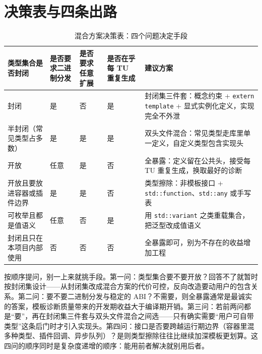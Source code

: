 \documentclass[12pt,a4paper,fontset=fandol]{ctexbook}
\newcommand{\kw}[1]{\texttt{#1}}
\begin{document}
\section{决策表与四条出路}

\begin{table}[htbp]
\centering
\caption{混合方案决策表：四个问题决定手段}
\begin{tabular}{@{}>{\raggedright\arraybackslash}p{}>{\raggedright\arraybackslash}p{}>{\raggedright\arraybackslash}p{}>{\raggedright\arraybackslash}p{}>{\raggedright\arraybackslash}p{}@{}}
\toprule
类型集合是否封闭 & 是否要求二进制分发 & 是否要求任意扩展 & 是否在乎每 TU 重复生成 & 建议方案 \\
\midrule
封闭 & 是 & 否 & 是 & 封闭集三件套：概念约束 + \kw{extern template} + 显式实例化定义，实现完全不外泄 \\
\addlinespace
半封闭（常见类型占多数） & 是 & 是 & 是 & 双头文件混合：常见类型走库里单一定义，自定义类型包含实现头 \\
\addlinespace
开放 & 任意 & 是 & 否 & 全暴露：定义留在公共头，接受每 TU 重复生成，换取最好的诊断 \\
\addlinespace
开放且要放进容器或插件边界 & 是 & 是 & 否 & 类型擦除：非模板接口 + \kw{std::function}、\kw{std::any} 或手写表 \\
\addlinespace
可枚举且都是值语义 & 任意 & 否 & 是 & 用 \kw{std::variant} 之类重载集合，把泛型改成值语义 \\
\addlinespace
封闭且只在本项目内部使用 & 否 & 否 & 否 & 全暴露即可，别为不存在的收益增加工程 \\
\bottomrule
\end{tabular}
\end{table}

\begin{guideline}[title={四条出路的排序}]
按顺序提问，别一上来就挑手段。第一问：类型集合要不要开放？回答不了就暂时按封闭集设计——从封闭集改成混合方案的代价可控，反向改造要动用户的包含关系。第二问：要不要二进制分发与稳定的 ABI？不需要，则全暴露通常是最诚实的答案，模板诊断质量带来的开发期收益大于编译期开销。第三问：若前两问都是“要”，再在封闭集三件套与双头文件混合之间选——只有确实需要“用户可自带类型”这条后门时才引入实现头。第四问：接口是否要跨越运行期边界（容器里混多种类型、插件回调、异步队列）？是则类型擦除往往比继续加深模板更划算。这四问的顺序同时是复杂度递增的顺序：能用前者解决就别用后者。
\end{guideline}
\end{document}
